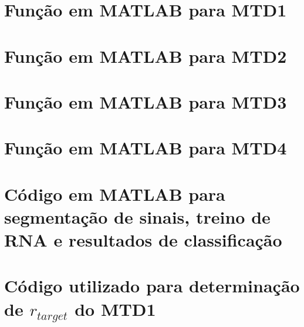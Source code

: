 	\postextual
	

	\begin{apendicesenv}
	\partapendices
\chapter{Função em MATLAB para MTD1}

\label{ap:seg_mtd1}
\chapter{Função em MATLAB para MTD2}

\label{ap:seg_mtd2}
\chapter{Função em MATLAB para MTD3}

\label{ap:seg_mtd3}
\chapter{Função em MATLAB para MTD4}

\label{ap:seg_mtd4}
\chapter{Código em MATLAB para segmentação de sinais, treino de RNA e resultados de classificação}

\label{ap:complete_mtd1}
\chapter{Código utilizado para determinação de $r_{target}$ do MTD1}
\label{ap:r_target}


\end{apendicesenv}
